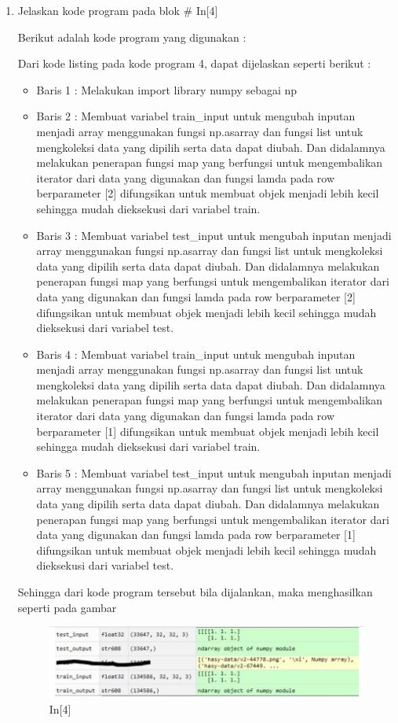 \begin{enumerate}
\begin{figure}[!htbp]
\end{figure}
\item Jelaskan kode program pada blok \# In[4]
\par Berikut adalah kode program yang digunakan :

\par Dari kode listing pada kode program 4, dapat dijelaskan seperti berikut :
\begin{itemize}
\item Baris 1	: Melakukan import library numpy sebagai np
\item Baris 2	: Membuat variabel train\_input untuk mengubah inputan menjadi array menggunakan fungsi np.asarray dan  fungsi list untuk mengkoleksi data yang dipilih serta data dapat diubah. Dan didalamnya melakukan penerapan fungsi map yang berfungsi untuk mengembalikan iterator dari data yang digunakan dan fungsi lamda pada row berparameter [2] difungsikan untuk membuat objek menjadi lebih kecil sehingga mudah dieksekusi dari variabel train.
\item Baris 3	: Membuat variabel test\_input untuk mengubah inputan menjadi array menggunakan fungsi np.asarray dan  fungsi list untuk mengkoleksi data yang dipilih serta data dapat diubah. Dan didalamnya melakukan penerapan fungsi map yang berfungsi untuk mengembalikan iterator dari data yang digunakan dan fungsi lamda pada row berparameter [2] difungsikan untuk membuat objek menjadi lebih kecil sehingga mudah dieksekusi dari variabel test.
\item Baris 4	: Membuat variabel train\_input untuk mengubah inputan menjadi array menggunakan fungsi np.asarray dan  fungsi list untuk mengkoleksi data yang dipilih serta data dapat diubah. Dan didalamnya melakukan penerapan fungsi map yang berfungsi untuk mengembalikan iterator dari data yang digunakan dan fungsi lamda pada row berparameter [1] difungsikan untuk membuat objek menjadi lebih kecil sehingga mudah dieksekusi dari variabel train.
\item Baris 5	: Membuat variabel test\_input untuk mengubah inputan menjadi array menggunakan fungsi np.asarray dan  fungsi list untuk mengkoleksi data yang dipilih serta data dapat diubah. Dan didalamnya melakukan penerapan fungsi map yang berfungsi untuk mengembalikan iterator dari data yang digunakan dan fungsi lamda pada row berparameter [1] difungsikan untuk membuat objek menjadi lebih kecil sehingga mudah dieksekusi dari variabel test.
\end{itemize}
\par Sehingga dari kode program tersebut bila dijalankan, maka menghasilkan seperti pada gambar 
\begin{figure}[!htbp]
	\centerline{\includegraphics[width=1\textwidth]{figures/andi/p4.PNG}}
	\caption{In[4]}
	

\end{figure}
\end{enumerate}
